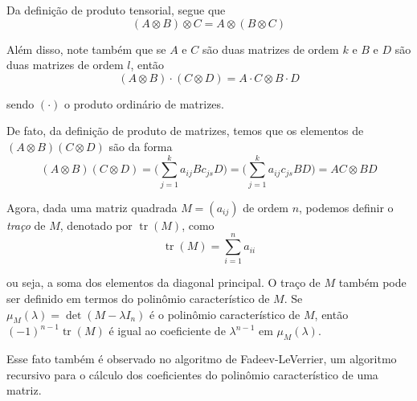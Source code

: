 \documentclass[a4paper,portuguese,11pt,twoside, leqno]{book}
\DeclareMathOperator{\tr}{tr}
\theoremstyle{definition}
\newtheorem{prop}{Proposição}[section]
\begin{document}
	\par\vspace{0.3cm} Da definição de produto tensorial, segue que 
	\begin{equation}
	\label{propriedade 1 tensorial}
	(A\otimes B)\otimes C = A\otimes(B\otimes C)
	\end{equation}
	\par\vspace{0.3cm} Além disso, note também que se $A$ e $C$ são duas matrizes de ordem $k$ e $B$ e  $D$ são duas matrizes de ordem $l$, então
	\begin{equation}
	\label{propriedade 2 tensorial}
	(A\otimes B)\cdot(C\otimes D) = A\cdot C\otimes B\cdot D
	\end{equation}
	\par\vspace{0.3cm} sendo $(\cdot)$ o produto ordinário de matrizes.
	\par\vspace{0.3cm} De fato, da definição de produto de matrizes, temos que os elementos de $(A\otimes B)(C\otimes D)$ são da forma
	\begin{equation*}
	(A\otimes B)(C\otimes D) = \Bigg(\displaystyle{ \sum_{j=1}^{k}a_{ij}Bc_{js}D}\Bigg) = \Bigg(\displaystyle{ \sum_{j=1}^{k}a_{ij}c_{js}}BD\Bigg) = AC\otimes BD 
	\end{equation*}
	\par\vspace{0.3cm} Agora, dada uma matriz quadrada $M = (a_{ij})$ de ordem $n$, podemos definir o \textit{traço} de $M$, denotado por $\tr(M)$, como
	\begin{equation*}
	\tr(M) = \sum_{i=1}^{n}a_{ii} 
	\end{equation*}
	\par\vspace{0.3cm} ou seja, a soma dos elementos da diagonal principal. O traço de $M$ também pode ser definido em termos do polinômio característico de $M$. Se $\mu_M(\lambda) = \det(M - \lambda I_n)$ é o polinômio característico	de $M$, então $(-1)^{n-1}\tr(M)$ é igual ao coeficiente de $\lambda^{n-1}$ em $\mu_M(\lambda)$. %
	\par\vspace{0.3cm} Esse fato também é observado no algoritmo de Fadeev-LeVerrier, um algoritmo recursivo para o cálculo dos coeficientes do polinômio característico de uma matriz. 
\end{document}
